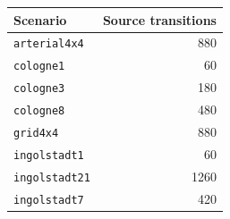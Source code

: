 \begin{tabular}{lr}
\toprule
Scenario & Source transitions \\
\midrule
\texttt{arterial4x4} & 880 \\
\texttt{cologne1} & 60 \\
\texttt{cologne3} & 180 \\
\texttt{cologne8} & 480 \\
\texttt{grid4x4} & 880 \\
\texttt{ingolstadt1} & 60 \\
\texttt{ingolstadt21} & 1260 \\
\texttt{ingolstadt7} & 420 \\
\bottomrule
\end{tabular}
